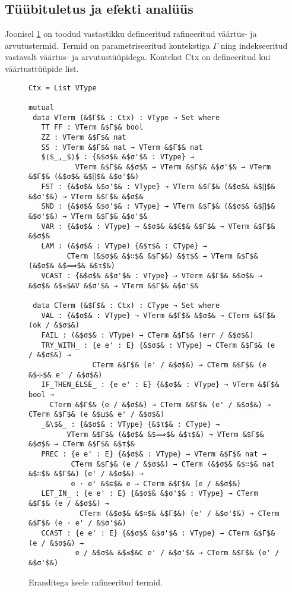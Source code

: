 \documentclass[a4paper,12pt]{article}
\begin{document}
\subsection{Tüübituletus ja efekti analüüs} \label{ssec:exc.inference}

Joonisel \ref{fig:exc.refined} on toodud vastastikku defineeritud rafineeritud väärtus- ja arvutustermid.
Termid on parametriseeritud kontekstiga $Γ$ ning indekseeritud vastavalt väärtus- ja arvutustüüpidega.
Kontekst Ctx on defineeritud kui väärtusttüüpide list.
\begin{figure}
  \begin{lstlisting}
Ctx = List VType

mutual
 data VTerm (&$Γ$& : Ctx) : VType → Set where
   TT FF : VTerm &$Γ$& bool
   ZZ : VTerm &$Γ$& nat
   SS : VTerm &$Γ$& nat → VTerm &$Γ$& nat
   $⟨$_,_$⟩$ : {&$σ$& &$σ'$& : VType} →
           VTerm &$Γ$& &$σ$& → VTerm &$Γ$& &$σ'$& → VTerm &$Γ$& (&$σ$& &$∏$& &$σ'$&)
   FST : {&$σ$& &$σ'$& : VType} → VTerm &$Γ$& (&$σ$& &$∏$& &$σ'$&) → VTerm &$Γ$& &$σ$&
   SND : {&$σ$& &$σ'$& : VType} → VTerm &$Γ$& (&$σ$& &$∏$& &$σ'$&) → VTerm &$Γ$& &$σ'$&
   VAR : {&$σ$& : VType} → &$σ$& &$∈$& &$Γ$& → VTerm &$Γ$& &$σ$&
   LAM : (&$σ$& : VType) {&$τ$& : CType} →
         CTerm (&$σ$& &$∷$& &$Γ$&) &$τ$& → VTerm &$Γ$& (&$σ$& &$⟹$& &$τ$&)
   VCAST : {&$σ$& &$σ'$& : VType} → VTerm &$Γ$& &$σ$& → &$σ$& &$≤$&V &$σ'$& → VTerm &$Γ$& &$σ'$&

 data CTerm (&$Γ$& : Ctx) : CType → Set where
   VAL : {&$σ$& : VType} → VTerm &$Γ$& &$σ$& → CTerm &$Γ$& (ok / &$σ$&)
   FAIL : (&$σ$& : VType) → CTerm &$Γ$& (err / &$σ$&)
   TRY_WITH_ : {e e' : E} {&$σ$& : VType} → CTerm &$Γ$& (e / &$σ$&) →
               CTerm &$Γ$& (e' / &$σ$&) → CTerm &$Γ$& (e &$⊹$& e' / &$σ$&)
   IF_THEN_ELSE_ : {e e' : E} {&$σ$& : VType} → VTerm &$Γ$& bool →
     CTerm &$Γ$& (e / &$σ$&) → CTerm &$Γ$& (e' / &$σ$&) → CTerm &$Γ$& (e &$⊔$& e' / &$σ$&)
   _&\$&_ : {&$σ$& : VType} {&$τ$& : CType} →
         VTerm &$Γ$& (&$σ$& &$⟹$& &$τ$&) → VTerm &$Γ$& &$σ$& → CTerm &$Γ$& &$τ$&
   PREC : {e e' : E} {&$σ$& : VType} → VTerm &$Γ$& nat →
          CTerm &$Γ$& (e / &$σ$&) → CTerm (&$σ$& &$∷$& nat &$∷$& &$Γ$&) (e' / &$σ$&) →
          e · e' &$⊑$& e → CTerm &$Γ$& (e / &$σ$&)
   LET_IN_ : {e e' : E} {&$σ$& &$σ'$& : VType} → CTerm &$Γ$& (e / &$σ$&) →
            CTerm (&$σ$& &$∷$& &$Γ$&) (e' / &$σ'$&) → CTerm &$Γ$& (e · e' / &$σ'$&)
   CCAST : {e e' : E} {&$σ$& &$σ'$& : VType} → CTerm &$Γ$& (e / &$σ$&) →
           e / &$σ$& &$≤$&C e' / &$σ'$& → CTerm &$Γ$& (e' / &$σ'$&)
  \end{lstlisting}
  \caption{Eranditega keele rafineeritud termid.}
  \label{fig:exc.refined}
\end{figure}
\end{document}
